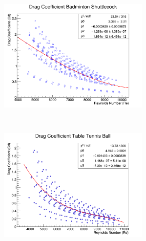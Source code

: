 \documentclass[paper=a4, fontsize=11pt, abstract=on]{scrartcl}
\numberwithin{equation}{section}		%
\numberwithin{figure}{section}			%
\numberwithin{table}{section}				%
\begin{document}
\begin{figure}[H]
        \centering
        \begin{subfigure}[H]{0.45\textwidth}
                \includegraphics[width = 7.5cm]{shut}
                \caption{}
				
        \end{subfigure}%
       ~~~~~
        \begin{subfigure}[h]{0.45\textwidth}
                \includegraphics[width = 7.5cm]{ping}
                \caption{}
                

\end{subfigure}
\end{figure}
\end{document}
